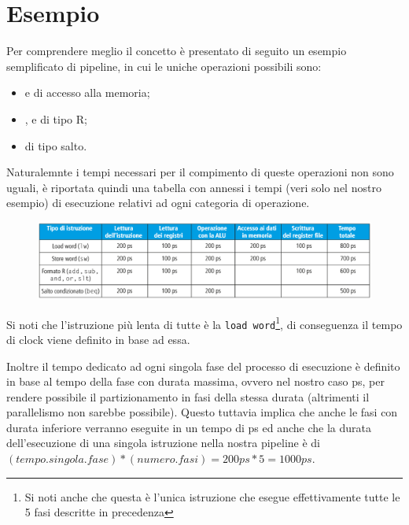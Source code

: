 \documentclass[class=book, crop=false, oneside]{standalone}
\begin{document}
\section{Esempio}
Per comprendere meglio il concetto è presentato di seguito un esempio semplificato di pipeline, in cui le uniche operazioni possibili sono:
\begin{itemize}[nolistsep]
	\item {} e  di accesso alla memoria;
	\item {},  e  di tipo R;
	\item {} di tipo salto.
\end{itemize}
Naturalemnte i tempi necessari per il compimento di queste operazioni non sono uguali, è riportata quindi una tabella con annessi i tempi (veri solo nel nostro esempio) di esecuzione relativi ad ogni categoria di operazione.
\begin{figure}[H]
	\centering
	\includegraphics[width=\textwidth,keepaspectratio]{tabella-tempi-operazioni.png}
\end{figure}
Si noti che l'istruzione più lenta di tutte è la \texttt{load word}\footnote{Si noti anche che questa è l'unica istruzione che esegue effettivamente tutte le 5 fasi descritte in precedenza}, di conseguenza il tempo di clock viene definito in base ad essa.

Inoltre il tempo dedicato ad ogni singola fase del processo di esecuzione è definito in base al tempo della fase con durata massima, ovvero nel nostro caso \unit[200]{ps}, per rendere possibile il partizionamento in fasi della stessa durata (altrimenti il parallelismo non sarebbe possibile).
Questo tuttavia implica che anche le fasi con durata inferiore verranno eseguite in un tempo di \unit[200]{ps} ed anche che la durata dell'esecuzione di una singola istruzione nella nostra pipeline è di \((tempo.singola.fase)*(numero.fasi)=200ps*5=1000ps\).
\end{document}
